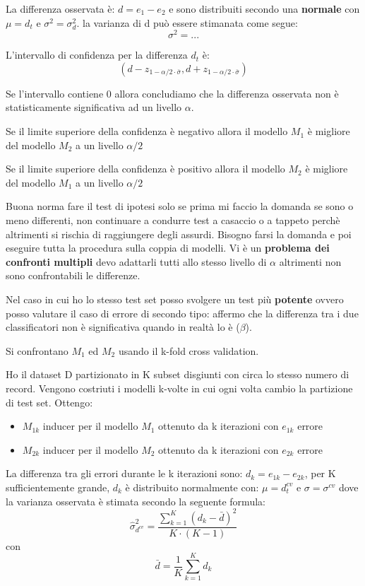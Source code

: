 La differenza osservata \`e: $d = e_1 - e_2$ e sono distribuiti secondo una \textbf{normale} con $\mu = d_t$ e $\sigma^2 = \sigma^2_d$. la varianza di d pu\`o essere stimanata come segue: \[\sigma^2 = ... \]

L'intervallo di confidenza per la differenza $d_t$ \`e: \[ (d - z_{1-\alpha/2 \cdot \bar{\sigma}}, d + z_{1-\alpha/2 \cdot \bar{\sigma}}) \]

Se l'intervallo contiene 0 allora concludiamo che la differenza osservata non \`e statisticamente significativa ad un livello $\alpha$. 

Se il limite superiore della confidenza \`e negativo allora il modello $M_1$ \`e migliore del modello $M_2$ a un livello $\alpha/2$

Se il limite superiore della confidenza \`e positivo allora il modello $M_2$ \`e migliore del modello $M_1$ a un livello $\alpha/2$

Buona norma fare il test di ipotesi solo se prima mi faccio la domanda se sono o meno differenti, non continuare a condurre test a casaccio o a tappeto perch\`e altrimenti si rischia di raggiungere degli assurdi. Bisogno farsi la domanda e poi eseguire tutta la procedura sulla coppia di modelli. Vi \`e un \textbf{problema dei confronti multipli} devo adattarli tutti allo stesso livello di $\alpha$ altrimenti non sono confrontabili le differenze. 

Nel caso in cui ho lo stesso test set posso svolgere un test pi\`u \textbf{potente} ovvero posso valutare il caso di errore di secondo tipo: affermo che la differenza tra i due classificatori non \`e significativa quando in realt\`a lo \`e ($\beta$). 

Si confrontano $M_1$ ed $M_2$ usando il k-fold cross validation.

Ho il dataset D partizionato in K subset disgiunti con circa lo stesso numero di record. Vengono costriuti i modelli k-volte in cui ogni volta cambio la partizione di test set. Ottengo:
\begin{itemize}
	\item $M_{1k}$ inducer per il modello $M_1$ ottenuto da k iterazioni con $e_{1k}$ errore
	\item $M_{2k}$ inducer per il modello $M_2$ ottenuto da k iterazioni con $e_{2k}$ errore
\end{itemize}

La differenza tra gli errori durante le k iterazioni sono: $d_k = e_{1k} - e_{2k}$, per K sufficientemente grande, $d_k$ \`e distribuito normalmente con: $\mu = d_t^{cv}$ e $\sigma = \sigma^{cv}$ dove la varianza osservata \`e stimata secondo la seguente formula: \[ \hat{\sigma}^2_{d^{cv}} = \frac{\sum_{k=1}^{K}(d_k - \bar{d})^2}{K \cdot (K-1)} \] con \[ \bar{d} = \frac{1}{K} \sum_{k=1}^K d_k \]

